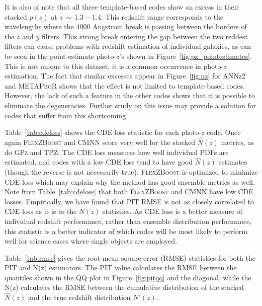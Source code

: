 It is also of note that all three template-based codes show an excess in their stacked $p(z)$ at $z\,\sim\,1.3-1.4$.  This redshift range corresponds to the wavelengths where the $4000$ Angstrom break is passing between the borders of the $z$ and $y$ filters.  This strong break entering the gap between the two reddest filters can cause problems with redshift estimation of individual galaxies, as can be seen in the point-estimate photo-$z$'s shown in Figure~\ref{fig:pz_pointestimates}.  This is not unique to this dataset, it is a common occurrence in photo-$z$ estimation.  The fact that similar excesses appear in Figure~\ref{fig:nz} for \textsc{ANNz2} and \textsc{METAPhoR} shows that the effect is not limited to template-based codes.  However, the lack of such a feature in the other codes shows that it is possible to eliminate the degeneracies.  Further study on this issue may provide a solution for codes that suffer from this shortcoming.




Table~\ref{tab:cdeloss} shows the CDE loss statistic for each photo-$z$ code.  Once again \textsc{FlexZBoost} and \textsc{CMNN} score very well for the stacked $\hat{N}(z)$ metrics, as do \textsc{GPz} and \textsc{TPZ}.  The CDE loss measures how well individual PDFs are estimated, and codes with a low CDE loss tend to have good $\hat{N}(z)$ estimates (though the reverse is not necessarily true). \textsc{FlexZBoost} is optimized to minimize CDE loss which may explain why the method has good ensemble metrics as well. Note from Table~\ref{tab:cdeloss} that both \textsc{FlexZBoost} and \textsc{CMNN} have low CDE losses.  Empirically, we have found that PIT RMSE is not as closely correlated to CDE loss as it is to the $N(z)$ statistics.  As CDE loss is a better measure of individual redshift performance, rather than ensemble distribution performance, this statistic is a better indicator of which codes will be most likely to perform well for science cases where single objects are employed.

Table~\ref{tab:rmse} gives the root-mean-square-error (RMSE) statistics for both the PIT and N(z) estimators.  The PIT value calculates the RMSE between the quantiles shown in the QQ plot in Figure~\ref{fig:pitqq} and the diagonal, while the N(z) calculates the RMSE between the cumulative distribution of the stacked $\hat{N}(z)$ and the true redshift distribution $N'(z)$.  %

